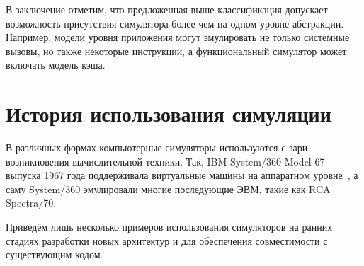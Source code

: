 В заключение отметим, что предложенная выше классификация допускает возможность присутствия симулятора более чем на одном уровне абстракции. Например, модели уровня приложения могут эмулировать не только системные вызовы, но также некоторые инструкции, а функциональный симулятор может включать модель кэша.

\section{История использования симуляции}

В различных формах компьютерные симуляторы используются с зари возникновения вычислительной техники. Так, IBM System/360 Model 67 выпуска 1967 года поддерживала виртуальные машины на аппаратном уровне~\cite{ibm360vm}, а саму System/360 эмулировали многие последующие ЭВМ, такие как RCA Spectra/70.

Приведём лишь несколько примеров использования симуляторов на ранних стадиях разработки новых архитектур и для обеспечения совместимости с существующим кодом.

